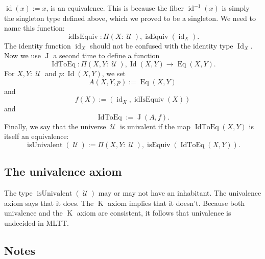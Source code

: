 \documentclass{article}
\newcommand{\Id}{\operatorname{Id}}
\newcommand{\J}{\operatorname{J}}
\newcommand{\K}{\operatorname{K}}
\newcommand{\U}{\operatorname{\mathcal{U}}}
\newcommand{\isEquiv}{\operatorname{isEquiv}}
\newcommand{\Eq}{\operatorname{Eq}}
\newcommand{\id}{\operatorname{id}}
\newcommand{\idIsEquiv}{\operatorname{idIsEquiv}}
\newcommand{\IdToEq}{\operatorname{IdToEq}}
\newcommand{\isUnivalent}{\operatorname{isUnivalent}}
\begin{document}
$\id(x) := x$, is an equivalence. This is because the fiber
$\id^{-1}(x)$ is simply the singleton type defined above, which we
proved to be a singleton. We need to name this function:
\[
   \idIsEquiv : \Pi(X:\U), \isEquiv(\id_X).
 \]
The identity function $\id_X$ should not be confused with the identity
type $\Id_X$. Now we use $\J$ a second time to define a function
\[
   \IdToEq : \Pi(X,Y:\U), \Id(X,Y) \to  \Eq(X,Y).
\]
For $X,Y:\U$ and $p:\Id(X,Y)$, we set
\[
   A(X,Y,p) := \Eq(X,Y)
\]  
and
\[
   f(X) := (\id_X , \idIsEquiv(X))
\]
and
\[
   \IdToEq := \J(A,f).
\]
Finally, we say that the universe $\U$ is univalent if the map
$\IdToEq(X,Y)$ is itself an equivalence:
\[
   \isUnivalent(\U) := \Pi(X,Y:\U), \isEquiv(\IdToEq(X,Y)).
\]

\subsection{The univalence axiom}

The type $\isUnivalent(\U)$ may or may not have an inhabitant. The
univalence axiom says that it does. The $\K$ axiom implies that it doesn't. 
Because both univalence and the $\K$ axiom are consistent, it follows that univalence is undecided in MLTT.

\subsection{Notes}
\end{document}
